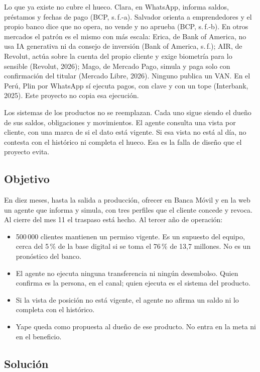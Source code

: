 \documentclass[11pt]{article}
\begin{document}
Lo que ya existe no cubre el hueco. Clara, en WhatsApp, informa saldos, préstamos y fechas de pago (BCP, s.\,f.-a). Salvador orienta a emprendedores y el propio banco dice que no opera, no vende y no aprueba (BCP, s.\,f.-b). En otros mercados el patrón es el mismo con más escala: Erica, de Bank of America, no usa IA generativa ni da consejo de inversión (Bank of America, s.\,f.); AIR, de Revolut, actúa sobre la cuenta del propio cliente y exige biometría para lo sensible (Revolut, 2026); Mago, de Mercado Pago, simula y paga solo con confirmación del titular (Mercado Libre, 2026). Ninguno publica un VAN. En el Perú, Plin por WhatsApp sí ejecuta pagos, con clave y con un tope (Interbank, 2025). Este proyecto no copia esa ejecución.

Los sistemas de los productos no se reemplazan. Cada uno sigue siendo el dueño de sus saldos, obligaciones y movimientos. El agente consulta una vista por cliente, con una marca de si el dato está vigente. Si esa vista no está al día, no contesta con el histórico ni completa el hueco. Esa es la falla de diseño que el proyecto evita.

\subsection{Objetivo}

En diez meses, hasta la salida a producción, ofrecer en Banca Móvil y en la web un agente que informa y simula, con tres perfiles que el cliente concede y revoca. Al cierre del mes 11 el traspaso está hecho. Al tercer año de operación:

\begin{itemize}
  \item 500\,000 clientes mantienen un permiso vigente. Es un supuesto del equipo, cerca del 5\,\% de la base digital si se toma el 76\,\% de 13,7 millones. No es un pronóstico del banco.
  \item El agente no ejecuta ninguna transferencia ni ningún desembolso. Quien confirma es la persona, en el canal; quien ejecuta es el sistema del producto.
  \item Si la vista de posición no está vigente, el agente no afirma un saldo ni lo completa con el histórico.
  \item Yape queda como propuesta al dueño de ese producto. No entra en la meta ni en el beneficio.
\end{itemize}

\subsection{Solución}
\end{document}
